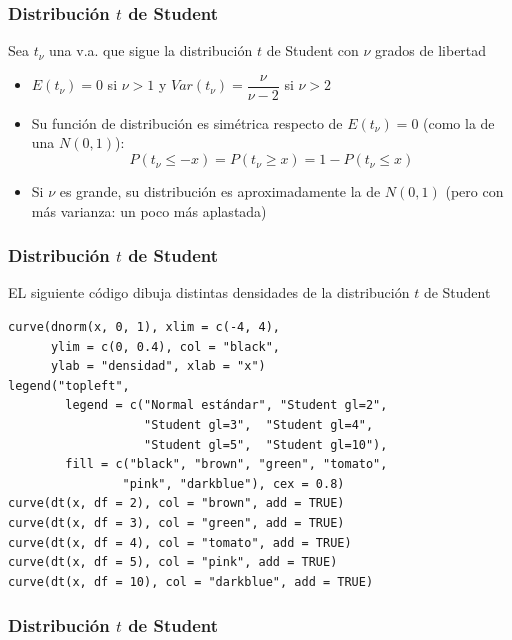 \documentclass[12pt,t]{beamer}
\renewcommand{\leq}{\leqslant}
\renewcommand{\geq}{\geqslant}
\theoremstyle{plain}
\theoremstyle{definition}
\begin{document}
\begin{frame}
\frametitle{Distribución $t$ de Student}

Sea $t_{\nu}$ una v.a. que sigue la distribución $t$ de
Student con $\nu$ grados de libertad
\medskip

\begin{itemize}
\item $E(t_{\nu})=0$  si $\nu>1$ y $Var(t_{\nu})=\dfrac{\nu}{\nu-2}$ si $\nu>2$
\medskip

\item Su  función de distribución es simétrica respecto de $E(t_{\nu})=0$ (como la de una $N(0,1)$):
$$
P(t_{\nu}\leq -x)=P(t_{\nu}\geq x)=1-P(t_{\nu}\leq x)
$$

\item Si $\nu$ es grande, su distribución es aproximadamente la de $N(0,1)$ (pero con más varianza: un poco más aplastada)
\end{itemize}

\end{frame}

\begin{frame}[fragile]
\frametitle{Distribución $t$ de Student}

EL siguiente código dibuja distintas densidades de la distribución $t$ de Student
{\small
\begin{verbatim}
curve(dnorm(x, 0, 1), xlim = c(-4, 4),
      ylim = c(0, 0.4), col = "black",
      ylab = "densidad", xlab = "x")
legend("topleft",  
        legend = c("Normal estándar", "Student gl=2",
                   "Student gl=3",  "Student gl=4", 
                   "Student gl=5",  "Student gl=10"),
        fill = c("black", "brown", "green", "tomato",
                "pink", "darkblue"), cex = 0.8)
curve(dt(x, df = 2), col = "brown", add = TRUE)
curve(dt(x, df = 3), col = "green", add = TRUE)
curve(dt(x, df = 4), col = "tomato", add = TRUE)
curve(dt(x, df = 5), col = "pink", add = TRUE)
curve(dt(x, df = 10), col = "darkblue", add = TRUE)
\end{verbatim}
}
\end{frame}

\begin{frame}
\frametitle{Distribución $t$ de Student}
\vspace*{-1cm}





\end{frame}
\end{document}

